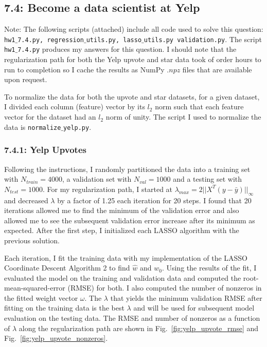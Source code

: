 \documentclass[12pt]{amsart}
\begin{document}
\subsection*{7.4: Become a data scientist at Yelp}

Note: The following scripts (attached) include all code used to solve this question: {\tt hw1$\_$7.4.py, regression$\_$utils.py, lasso$\_$utils.py  validation.py}.  The script {\tt hw1$\_$7.4.py} produces my answers for this question.  I should note that the regularization path for both the Yelp upvote and star data took of order hours to run to completion so I cache the results as NumPy $.npz$ files that are available upon request.  

To normalize the data for both the upvote and star datasets, for a given dataset, I divided each column (feature) vector by its $l_2$ norm such that each feature vector for the dataset had an $l_2$ norm of unity.  The script I used to normalize the data is {\tt normalize$\_$yelp.py}.

\subsubsection*{7.4.1: Yelp Upvotes}

Following the instructions, I randomly partitioned the data into a training set with $N_{train} = 4000$, a validation set with $N_{val} = 1000$ and a testing set with $N_{test} = 1000$.  For my regularization path, I started at $\lambda_{max} = 2 ||X^{T}(y - \bar{y}) ||_{\infty}$ and decreased $\lambda$ by a factor of 1.25 each iteration for 20 steps.  I found that 20 iterations allowed me to find the minimum of the validation error and also allowed me to see the subsequent validation error increase after its minimum as expected.  After the first step, I initialized each LASSO algorithm with the previous solution.  

Each iteration, I fit the training data with my implementation of the LASSO Coordinate Descent Algorithm 2 to find $\hat{w}$ and $w_0$.  Using the results of the fit, I evaluated the model on the training and validation data and computed the root-mean-squared-error (RMSE) for both.  I also computed the number of nonzeros in the fitted weight vector $\omega$.  The $\lambda$ that yields the minimum validation RMSE after fitting on the training data is the best $\lambda$ and will be used for subsequent model evaluation on the testing data.  The RMSE and number of nonzeros as a function of $\lambda$ along the regularization path are shown in Fig.~\ref{fig:yelp_upvote_rmse} and Fig.~\ref{fig:yelp_upvote_nonzeros}.
\end{document}
